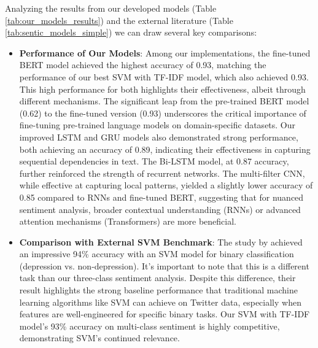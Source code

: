 Analyzing the results from our developed models (Table \ref{tab:our_models_results}) and the external literature (Table \ref{tab:sentic_models_simple}) we can draw several key comparisons:

\begin{itemize}
\item \textbf{Performance of Our Models}: Among our implementations, the fine-tuned BERT model achieved the highest accuracy of 0.93, matching the performance of our best SVM with TF-IDF model, which also achieved 0.93. This high performance for both highlights their effectiveness, albeit through different mechanisms. The significant leap from the pre-trained BERT model (0.62) to the fine-tuned version (0.93) underscores the critical importance of fine-tuning pre-trained language models on domain-specific datasets. Our improved LSTM and GRU models also demonstrated strong performance, both achieving an accuracy of 0.89, indicating their effectiveness in capturing sequential dependencies in text. The Bi-LSTM model, at 0.87 accuracy, further reinforced the strength of recurrent networks. The multi-filter CNN, while effective at capturing local patterns, yielded a slightly lower accuracy of 0.85 compared to RNNs and fine-tuned BERT, suggesting that for nuanced sentiment analysis, broader contextual understanding (RNNs) or advanced attention mechanisms (Transformers) are more beneficial.

\item \textbf{Comparison with External SVM Benchmark}: The study by \cite{costa2021image} achieved an impressive 94\% accuracy with an SVM model for binary classification (depression vs. non-depression). It's important to note that this is a different task than our three-class sentiment analysis. Despite this difference, their result highlights the strong baseline performance that traditional machine learning algorithms like SVM can achieve on Twitter data, especially when features are well-engineered for specific binary tasks. Our SVM with TF-IDF model's 93\% accuracy on multi-class sentiment is highly competitive, demonstrating SVM's continued relevance.


\end{itemize}
